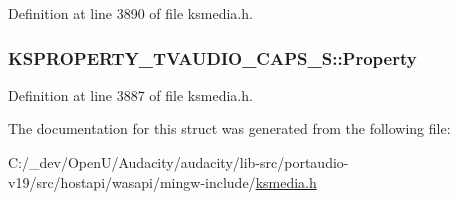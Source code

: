 Definition at line 3890 of file ksmedia.\+h.

\subsubsection[{\texorpdfstring{Property}{Property}}]{ K\+S\+P\+R\+O\+P\+E\+R\+T\+Y\+\_\+\+T\+V\+A\+U\+D\+I\+O\+\_\+\+C\+A\+P\+S\+\_\+\+S\+::\+Property}\hypertarget{struct_k_s_p_r_o_p_e_r_t_y___t_v_a_u_d_i_o___c_a_p_s___s_a47dc163fb700d2d1fea9ce32939f6041}{}\label{struct_k_s_p_r_o_p_e_r_t_y___t_v_a_u_d_i_o___c_a_p_s___s_a47dc163fb700d2d1fea9ce32939f6041}


Definition at line 3887 of file ksmedia.\+h.



The documentation for this struct was generated from the following file\+:\begin{DoxyCompactItemize}
\item 
C\+:/\+\_\+dev/\+Open\+U/\+Audacity/audacity/lib-\/src/portaudio-\/v19/src/hostapi/wasapi/mingw-\/include/\hyperlink{ksmedia_8h}{ksmedia.\+h}\end{DoxyCompactItemize}
